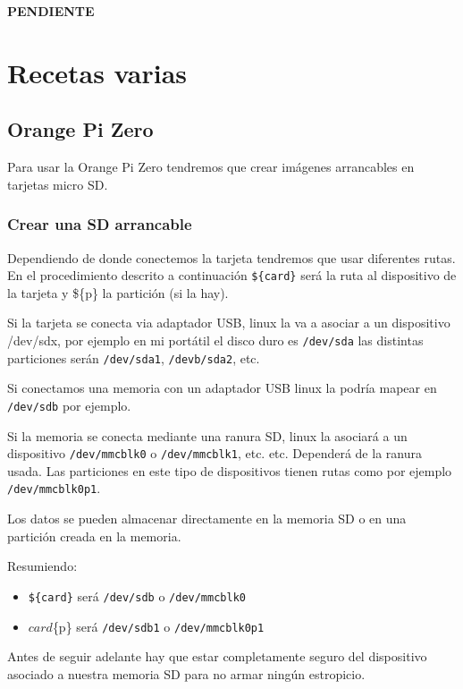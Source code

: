 \documentclass[12pt,spanish,]{scrartcl}
\providecommand{\tightlist}{%
  \setlength{\itemsep}{0pt}\setlength{\parskip}{0pt}}
\begin{document}
\textbf{PENDIENTE}

\section{Recetas varias}\label{recetas-varias}

\subsection{Orange Pi Zero}\label{orange-pi-zero}

Para usar la Orange Pi Zero tendremos que crear imágenes arrancables en
tarjetas micro SD.

\subsubsection{Crear una SD arrancable}\label{crear-una-sd-arrancable}

Dependiendo de donde conectemos la tarjeta tendremos que usar diferentes
rutas. En el procedimiento descrito a continuación \texttt{\$\{card\}}
será la ruta al dispositivo de la tarjeta y \$\{p\} la partición (si la
hay).

Si la tarjeta se conecta via adaptador USB, linux la va a asociar a un
dispositivo /dev/sdx, por ejemplo en mi portátil el disco duro es
\texttt{/dev/sda} las distintas particiones serán \texttt{/dev/sda1},
\texttt{/devb/sda2}, etc.

Si conectamos una memoria con un adaptador USB linux la podría mapear en
\texttt{/dev/sdb} por ejemplo.

Si la memoria se conecta mediante una ranura SD, linux la asociará a un
dispositivo \texttt{/dev/mmcblk0} o \texttt{/dev/mmcblk1}, etc. etc.
Dependerá de la ranura usada. Las particiones en este tipo de
dispositivos tienen rutas como por ejemplo \texttt{/dev/mmcblk0p1}.

Los datos se pueden almacenar directamente en la memoria SD o en una
partición creada en la memoria.

Resumiendo:

\begin{itemize}
\tightlist
\item
  \texttt{\$\{card\}} será \texttt{/dev/sdb} o \texttt{/dev/mmcblk0}
\item
  \({card}\)\{p\} será \texttt{/dev/sdb1} o \texttt{/dev/mmcblk0p1}
\end{itemize}

Antes de seguir adelante hay que estar completamente seguro del
dispositivo asociado a nuestra memoria SD para no armar ningún
estropicio.
\end{document}
